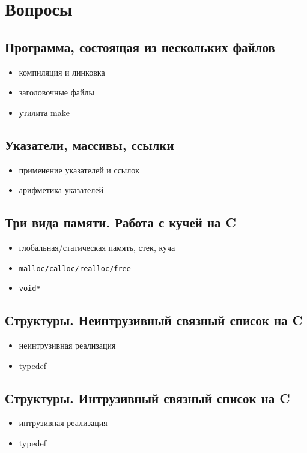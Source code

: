 % 
% 

\chapter{Вопросы}
\section{Программа, состоящая из нескольких файлов}
\begin{itemize}[noitemsep]
    \item компиляция и линковка
    \item заголовочные файлы
    \item утилита make
\end{itemize}
\section{Указатели, массивы, ссылки}
\begin{itemize}[noitemsep]
    \item применение указателей и ссылок
    \item арифметика указателей
\end{itemize}
\section{Три вида памяти. Работа с кучей на C}
\begin{itemize}[noitemsep]
    \item глобальная/статическая память, стек, куча
    \item \begin{verbatim}malloc/calloc/realloc/free\end{verbatim}
    \item \begin{verbatim}void*\end{verbatim}
\end{itemize}
\section{Структуры. Неинтрузивный связный список на C}
\begin{itemize}[noitemsep]
    \item неинтрузивная реализация
    \item typedef
\end{itemize}
\section{Структуры. Интрузивный связный список на C}
\begin{itemize}[noitemsep]
    \item интрузивная реализация
    \item typedef
\end{itemize}
